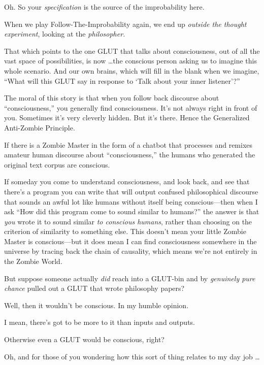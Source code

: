 {
 Oh. So your \textit{specification} is the source of the
improbability here.}

{
 When we play Follow-The-Improbability again, we end up
\textit{outside the thought experiment}, looking at the
\textit{philosopher.}}

{
 That which points to the one GLUT that talks about consciousness,
out of all the vast space of possibilities, is now \ldots the conscious
person asking us to imagine this whole scenario. And our own brains,
which will fill in the blank when we imagine, ``What
will this GLUT say in response to `Talk about your inner
listener'?''}

{
 The moral of this story is that when you follow back discourse
about ``consciousness,'' you
generally find consciousness. It's not always right in
front of you. Sometimes it's very cleverly hidden. But
it's there. Hence the Generalized Anti-Zombie
Principle.}

{
 If there is a Zombie Master in the form of a chatbot that
processes and remixes amateur human discourse about
``consciousness,'' the humans who
generated the original text corpus are conscious.}

{
 If someday you come to understand consciousness, and look back,
and see that there's a program you can write that will
output confused philosophical discourse that sounds an awful lot like
humans without itself being conscious---then when I ask
``How did this program come to sound similar to
humans?'' the answer is that \textit{you} wrote it to
sound similar \textit{to conscious humans}, rather than choosing on the
criterion of similarity to something else. This doesn't
mean your little Zombie Master is conscious---but it does mean I can
find consciousness somewhere in the universe by tracing back the chain
of causality, which means we're not entirely in the
Zombie World.}

{
 But suppose someone actually \textit{did} reach into a GLUT-bin
and by \textit{genuinely pure }\textit{chance} pulled out a GLUT that
wrote philosophy papers?}

{
 Well, then it wouldn't be conscious. In my humble
opinion.}

{
 I mean, there's got to be more to it than inputs
and outputs.}

{
 Otherwise even a GLUT would be conscious, right?}

{
 Oh, and for those of you wondering how this sort of thing relates
to my day job \ldots}

